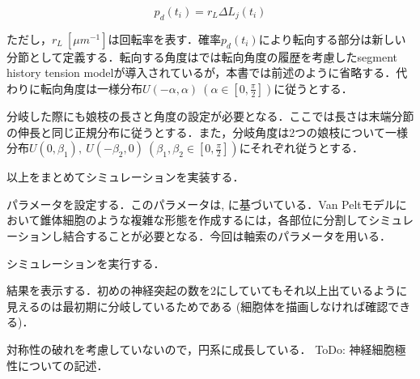 \begin{equation}
p_d(t_i) = r_L\Delta L_j(t_i)
\end{equation}


ただし，$r_L\ [\mu m^{-1}]$は回転率を表す．確率$p_d(t_i)$により転向する部分は新しい分節として定義する．転向する角度は\cite{Koene2009-hv}では転向角度の履歴を考慮したsegment history tension modelが導入されているが，本書では前述のように省略する．代わりに転向角度は一様分布$U(-\alpha, \alpha)\ \left(\alpha\in \left[0, \frac{\pi}{2}\right]\right)$に従うとする．

分岐した際にも娘枝の長さと角度の設定が必要となる．ここでは長さは末端分節の伸長と同じ正規分布に従うとする．また，分岐角度は2つの娘枝について一様分布$U(0, \beta_1),\ U(-\beta_2, 0)\ \left(\beta_1, \beta_2\in \left[0, \frac{\pi}{2}\right]\right)$にそれぞれ従うとする．

以上をまとめてシミュレーションを実装する．

パラメータを設定する．このパラメータは\cite{Koene2009-hv}, \cite{Van_Ooyen2014-fb}に基づいている．Van Peltモデルにおいて錐体細胞のような複雑な形態を作成するには，各部位に分割してシミュレーションし結合することが必要となる．今回は軸索のパラメータを用いる．

シミュレーションを実行する．

結果を表示する．初めの神経突起の数を2にしていてもそれ以上出ているように見えるのは最初期に分岐しているためである (細胞体を描画しなければ確認できる)．


対称性の破れを考慮していないので，円系に成長している．
ToDo: 神経細胞極性についての記述．
